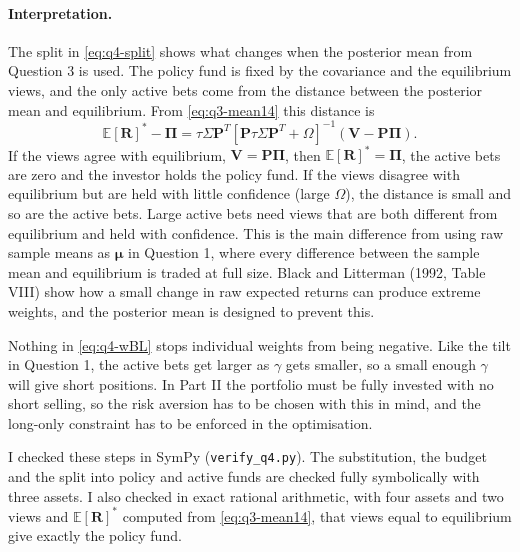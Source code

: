\documentclass[11pt]{article}
\numberwithin{equation}{section}
\begin{document}
\paragraph{Interpretation.}
The split in \eqref{eq:q4-split} shows what changes when the posterior mean from Question 3 is used. The policy fund is fixed by the covariance and the equilibrium views, and the only active bets come from the distance between the posterior mean and equilibrium. From \eqref{eq:q3-mean14} this distance is
\begin{equation*}
  \mathbb{E}[\bm{R}]^{*} - \bm{\Pi} = \tau\Sigma\bm{P}^{T}\left[\bm{P}\tau\Sigma\bm{P}^{T} + \Omega\right]^{-1}\left(\bm{V} - \bm{P}\bm{\Pi}\right).
\end{equation*}
If the views agree with equilibrium, $\bm{V} = \bm{P}\bm{\Pi}$, then $\mathbb{E}[\bm{R}]^{*} = \bm{\Pi}$, the active bets are zero and the investor holds the policy fund. If the views disagree with equilibrium but are held with little confidence (large $\Omega$), the distance is small and so are the active bets. Large active bets need views that are both different from equilibrium and held with confidence. This is the main difference from using raw sample means as $\bm{\mu}$ in Question 1, where every difference between the sample mean and equilibrium is traded at full size. Black and Litterman (1992, Table VIII) show how a small change in raw expected returns can produce extreme weights, and the posterior mean is designed to prevent this.

Nothing in \eqref{eq:q4-wBL} stops individual weights from being negative. Like the tilt in Question 1, the active bets get larger as $\gamma$ gets smaller, so a small enough $\gamma$ will give short positions. In Part II the portfolio must be fully invested with no short selling, so the risk aversion has to be chosen with this in mind, and the long-only constraint has to be enforced in the optimisation.

I checked these steps in SymPy (\texttt{verify\_q4.py}). The substitution, the budget and the split into policy and active funds are checked fully symbolically with three assets. I also checked in exact rational arithmetic, with four assets and two views and $\mathbb{E}[\bm{R}]^{*}$ computed from \eqref{eq:q3-mean14}, that views equal to equilibrium give exactly the policy fund.
\end{document}
